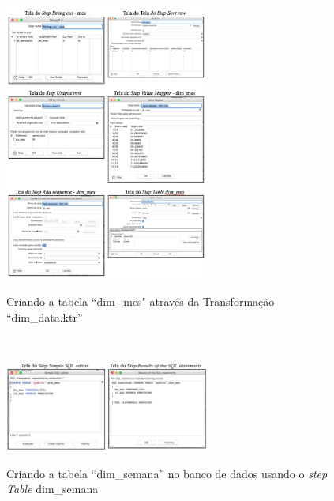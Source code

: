 \begin{figure}[H]
	\vspace*{0,2cm}
    \centering
    \caption{Criando a tabela ``dim\_mes" atrav\'{e}s da Transforma\c{c}\~{a}o ``dim\_data.ktr''}
    \includegraphics[width=0.6\textwidth]{./04-figuras/figura-dim-mes}
    \label{fig:ilustfigdimmes}
\end{figure}
\vspace*{-0,9cm}
{\raggedright {}} \\

\begin{figure}[H]
	\vspace*{0,2cm}
    \centering
    \caption{Criando a tabela ``dim\_semana'' no banco de dados usando o \textit{step Table} dim\_semana}
    \includegraphics[width=0.6\textwidth]{./04-figuras/figura-tb-dim-mes}
    \label{fig:ilustfigtbdimmes}
\end{figure}
\vspace*{-0,9cm}
{\raggedright {}} \\

